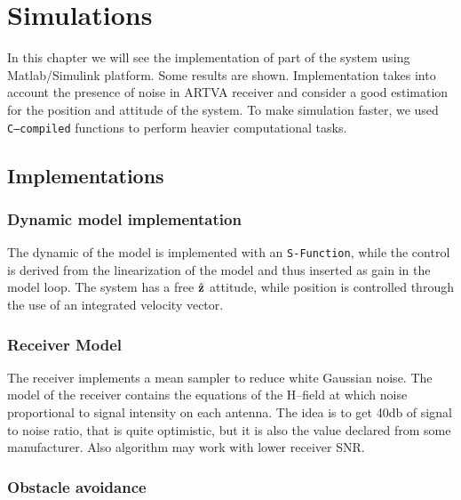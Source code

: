 \chapter{Simulations}
\minitoc
\thispagestyle{plain}

In this chapter we will see the implementation of part of the system using Matlab/Simulink platform. Some results are shown. Implementation takes into account the presence of noise in ARTVA receiver and consider a good estimation for the position and attitude of the system. To make simulation faster, we used \texttt{C--compiled} functions to perform heavier computational tasks. 

\section{Implementations}

\subsection{Dynamic model implementation}

The dynamic of the model is implemented with an \texttt{S-Function}, while the control is derived from the linearization of the model and thus inserted as gain in the model loop. The system has a free $\hat{\mathbf{z}}$ attitude, while position is controlled through the use of an integrated velocity vector.


\subsection{Receiver Model}

The receiver implements a mean sampler to reduce white Gaussian noise. The model of the receiver contains the equations of the H--field at which noise proportional to signal intensity on each antenna. The idea is to get \num{40}\si{\decibel} of signal to noise ratio, that is quite optimistic, but it is also the value declared from some manufacturer. Also algorithm may work with lower receiver SNR.


\subsection{Obstacle avoidance}

